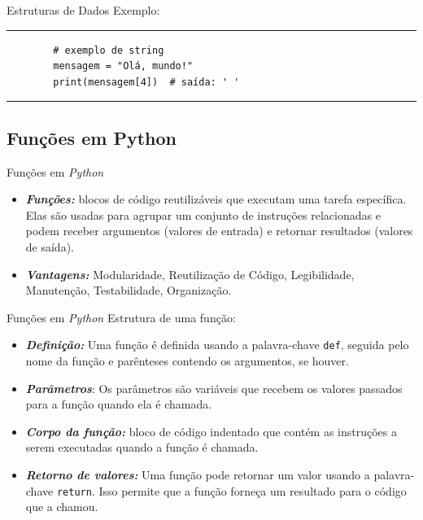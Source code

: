 \documentclass{beamer}
\begin{document}
\begin{frame}[fragile]{Estruturas de Dados}
	\label{estruturas_de_dados_02_exemplos}
	Exemplo:
	\rule{\textwidth}{1pt}
	\scriptsize
	\begin{verbatim}
		# exemplo de string
		mensagem = "Olá, mundo!"
		print(mensagem[4])  # saída: ' '
	\end{verbatim}
	\rule{\textwidth}{1pt}
\end{frame}

\subsection{Funções em Python}
\begin{frame}{Funções em \textit{Python}}
	\label{funcoes}
	\begin{itemize}
		\item \textbf{\textit{Funções:}} blocos de código reutilizáveis que executam uma tarefa específica. Elas são usadas para agrupar um conjunto de instruções relacionadas e podem receber argumentos (valores de entrada) e retornar resultados (valores de saída).
		\item \textbf{\textit{Vantagens:}} Modularidade, Reutilização de Código, Legibilidade, Manutenção, Testabilidade, Organização.
	\end{itemize}
\end{frame}

\begin{frame}{Funções em \textit{Python}}
	\label{estruturas_de_funcoes}
	Estrutura de uma função:
	\begin{itemize}
		\item \textbf{\textit{Definição:}} Uma função é definida usando a palavra-chave \texttt{def}, seguida pelo nome da função e parênteses contendo os argumentos, se houver.
		\item \textbf{\textit{Parâmetros}}: Os parâmetros são variáveis que recebem os valores passados para a função quando ela é chamada. 
		\item \textbf{\textit{Corpo da função:}} bloco de código indentado que contém as instruções a serem executadas quando a função é chamada. 
		\item \textbf{\textit{Retorno de valores:}} Uma função pode retornar um valor usando a palavra-chave \texttt{return}. Isso permite que a função forneça um resultado para o código que a chamou.
	\end{itemize}
\end{frame}
\end{document}
